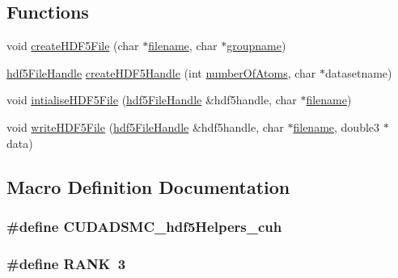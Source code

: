 \subsection*{Functions}
\begin{DoxyCompactItemize}
\item 
void \hyperlink{hdf5_helpers_8cuh_aa934ce2162402ac5571b0a9273a8d540}{create\+H\+D\+F5\+File} (char $\ast$\hyperlink{main_8cu_a6c2affe0788e6ba12dce7a51e1bd35c3}{filename}, char $\ast$\hyperlink{main_8cu_a8fed0c6a45def4b6cfc33b6c2d6b529a}{groupname})
\item 
\hyperlink{structhdf5_file_handle}{hdf5\+File\+Handle} \hyperlink{hdf5_helpers_8cuh_ac7967eb74c2b889d3ff30829b7ad5354}{create\+H\+D\+F5\+Handle} (int \hyperlink{initial_system_parameters_8cuh_a5ce690e43012981ef3034cbf0c746489}{number\+Of\+Atoms}, char $\ast$datasetname)
\item 
void \hyperlink{hdf5_helpers_8cuh_ad645ffddc471fbc80396e341cd9c5b46}{intialise\+H\+D\+F5\+File} (\hyperlink{structhdf5_file_handle}{hdf5\+File\+Handle} \&hdf5handle, char $\ast$\hyperlink{main_8cu_a6c2affe0788e6ba12dce7a51e1bd35c3}{filename})
\item 
void \hyperlink{hdf5_helpers_8cuh_a8afd9ab3ed3821c7405255e317542636}{write\+H\+D\+F5\+File} (\hyperlink{structhdf5_file_handle}{hdf5\+File\+Handle} \&hdf5handle, char $\ast$\hyperlink{main_8cu_a6c2affe0788e6ba12dce7a51e1bd35c3}{filename}, double3 $\ast$data)
\end{DoxyCompactItemize}


\subsection{Macro Definition Documentation}
\hypertarget{hdf5_helpers_8cuh_aebe4dc6d7f7166f335c0bfb7c8eb81bd}{
\subsubsection[{C\+U\+D\+A\+D\+S\+M\+C\+\_\+hdf5\+Helpers\+\_\+cuh}]{\setlength{\rightskip}{0pt plus 5cm}\#define C\+U\+D\+A\+D\+S\+M\+C\+\_\+hdf5\+Helpers\+\_\+cuh}}\label{hdf5_helpers_8cuh_aebe4dc6d7f7166f335c0bfb7c8eb81bd}
\hypertarget{hdf5_helpers_8cuh_a4e76a9ce86d91fa75775a7ae3f8d3aa5}{
\subsubsection[{R\+A\+N\+K}]{\setlength{\rightskip}{0pt plus 5cm}\#define R\+A\+N\+K~3}}\label{hdf5_helpers_8cuh_a4e76a9ce86d91fa75775a7ae3f8d3aa5}


